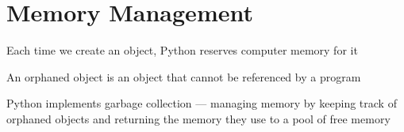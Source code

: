 \documentclass[8pt,a4paper,compress]{beamer}
\begin{document}
\section{Memory Management}
\begin{frame}[fragile]
\pause

\begin{minipage}{200pt}
Each time we create an object, Python reserves computer memory for it

\pause
\bigskip

An orphaned object is an object that cannot be referenced by a program

\pause
\bigskip

Python implements garbage collection --- managing memory by keeping track of orphaned objects and returning the memory they use to a pool of free memory
\end{minipage}%
\begin{minipage}{100pt}
\begin{center}

\end{center}
\end{minipage}
\end{frame}
\end{document}
